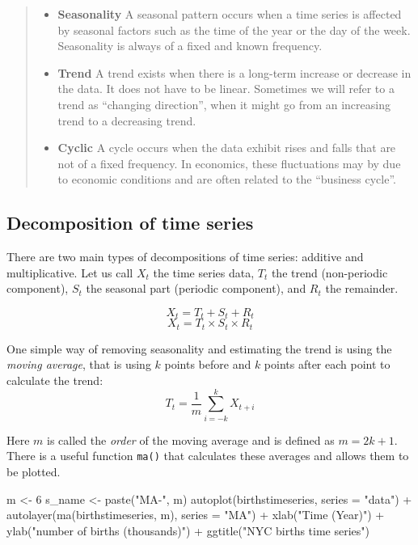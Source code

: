 \documentclass[
  letterpaper,
  DIV=11,
  numbers=noendperiod]{scrreprt}
\newenvironment{Shaded}{\begin{snugshade}}{\end{snugshade}}
\newcommand{\NormalTok}[1]{\textcolor[rgb]{0.00,0.23,0.31}{#1}}
\begin{document}
\begin{quote}
\begin{itemize}
\item
  \textbf{Seasonality} A seasonal pattern occurs when a time series is
  affected by seasonal factors such as the time of the year or the day
  of the week. Seasonality is always of a fixed and known frequency.
\item
  \textbf{Trend} A trend exists when there is a long-term increase or
  decrease in the data. It does not have to be linear. Sometimes we will
  refer to a trend as ``changing direction'', when it might go from an
  increasing trend to a decreasing trend.
\item
  \textbf{Cyclic} A cycle occurs when the data exhibit rises and falls
  that are not of a fixed frequency. In economics, these fluctuations
  may by due to economic conditions and are often related to the
  ``business cycle''.
\end{itemize}
\end{quote}

\subsection{Decomposition of time
series}\label{decomposition-of-time-series-1}

There are two main types of decompositions of time series: additive and
multiplicative. Let us call \(X_t\) the time series data, \(T_t\) the
trend (non-periodic component), \(S_t\) the seasonal part (periodic
component), and \(R_t\) the remainder.

\[
X_t = T_t + S_t + R_t
\] \[
X_t = T_t \times S_t \times R_t
\]

One simple way of removing seasonality and estimating the trend is using
the \emph{moving average}, that is using \(k\) points before and \(k\)
points after each point to calculate the trend: \[
T_t =  \frac{1}{m} \sum_{i=-k}^k X_{t+i}
\]

Here \(m\) is called the \emph{order} of the moving average and is
defined as \(m = 2k+1\). There is a useful function \texttt{ma()} that
calculates these averages and allows them to be plotted.

\begin{Shaded}
\begin{Highlighting}[]
\NormalTok{m \textless{}{-} 6}
\NormalTok{s\_name \textless{}{-} paste("MA{-}", m)}
\NormalTok{autoplot(birthstimeseries, series = "data") +}
\NormalTok{  autolayer(ma(birthstimeseries, m), series = "MA") +}
\NormalTok{  xlab("Time (Year)") + ylab("number of births (thousands)") +}
\NormalTok{  ggtitle("NYC births time series") }
\end{Highlighting}
\end{Shaded}
\end{document}
